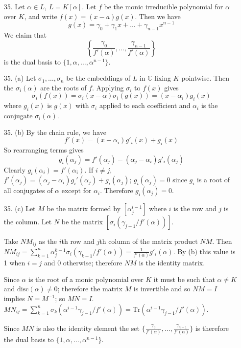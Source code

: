\documentclass{article}
\newcommand{\trace}[1]{\text{Tr}(#1)}
\newcommand{\disc}[1]{\text{disc}(#1)}
\begin{document}
\begin{enumerate}
\item[35.] Let $\alpha \in L$, $L = K[\alpha]$.  Let $f$ be the monic irreducible polynomial for $\alpha$ over $K$, and write $f(x) = (x - a)g(x)$.  Then we have \[ g(x) = \gamma_0 + \gamma_1 x + \ldots + \gamma_{n-1}x^{n-1} \]
We claim that \[ \left\{ \frac{\gamma_0}{f'(\alpha)}, \ldots, \frac{\gamma_{n-1}}{f'(\alpha)} \right\} \] is the dual basis to $\{ 1, \alpha, \ldots, \alpha^{n-1} \}$.

\item[35. (a)] Let $\sigma_1, \ldots, \sigma_n$ be the embeddings of $L$ in $\mathbb{C}$ fixing $K$ pointwise.  Then the $\sigma_i(\alpha)$ are the roots of $f$.  Applying $\sigma_i$ to $f(x)$ gives \[\sigma_i(f(x)) = \sigma_i(x - \alpha)\sigma_i(g(x)) = (x - \alpha_i)g_{i}(x)\] where $g_i(x)$ is $g(x)$ with $\sigma_i$ applied to each coefficient and $\alpha_i$ is the conjugate $\sigma_i(\alpha)$.
\item[35. (b)] By the chain rule, we have
\[ f'(x) = (x - \alpha_i)g'_i(x) + g_i(x) \]
So rearranging terms gives \[g_i(\alpha_j) = f'(\alpha_j) - (\alpha_j - \alpha_i)g'_i(\alpha_j) \] Clearly $g_i(\alpha_i) = f'(\alpha_i)$.  If $i \neq j$, $f'(\alpha_j) = (\alpha_j - \alpha_i)g_i'(\alpha_j) + g_i(\alpha_j)$; $g_i(\alpha_j) = 0$ since $g_i$ is a root of all conjugates of $\alpha$ except for $\alpha_i$.  Therefore $g_i(\alpha_j) = 0$.

\item[35. (c)] Let $M$ be the matrix formed by $[ \alpha_j^{i-1}]$ where $i$ is the row and $j$ is the column.  Let $N$ be the matrix $[\sigma_i(\gamma_{j - 1}/f'(\alpha))]$.

Take $NM_{ij}$ as the $i$th row and $j$th column of the matrix product $NM$.  Then $NM_{ij} = \sum^{n}_{k = 1} \alpha_{j}^{k - 1} \sigma_i(\gamma_{k - 1} / f'(\alpha)) = \frac{1}{f'(\alpha)} g'_i(\alpha)$.  By (b) this value is 1 when $i = j$ and 0 otherwise; therefore $NM$ is the identity matrix.

Since $\alpha$ is the root of a monic polynomial over $K$ it must be such that $\alpha \neq K$ and $\disc{\alpha} \neq 0$; therefore the matrix $M$ is invertible and so $NM = I$ implies $N = M^{-1}$; so $MN = I$.  $MN_{ij} = \sum_{k = 1}^{n} \sigma_{k}(\alpha^{i - 1}\gamma_{j - 1}/f'(\alpha)) = \trace{\alpha^{i-1}\gamma_{j - 1}/f'(\alpha)}$.

Since $MN$ is also the identity element the set $\{ \frac{\gamma_{0}}{f'(\alpha)}, \ldots, \frac{\gamma_{n - 1}}{f'(\alpha)} \}$ is therefore the dual basis to $\{ 1, \alpha, \ldots, \alpha^{n-1} \}$.


\end{enumerate}
\end{document}
